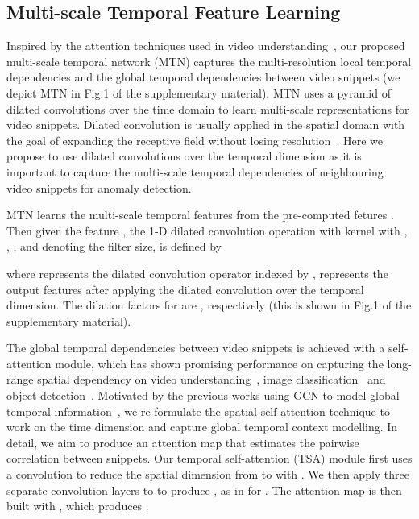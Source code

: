 \documentclass[final]{cvpr}
\begin{document}
\subsection{Multi-scale Temporal Feature Learning}

Inspired by the attention techniques used in video understanding~\cite{wang2018non,8451429}, our proposed multi-scale temporal network (MTN) captures the multi-resolution local temporal dependencies and the global temporal dependencies between video snippets (we depict MTN in Fig.1 of the supplementary material). MTN uses a pyramid of dilated convolutions over the time domain to learn multi-scale representations for video snippets. 
Dilated convolution is usually applied in the spatial domain with the goal of expanding the receptive field without losing resolution~\cite{yu2015multi}. Here we propose to use dilated convolutions over the temporal dimension as it is important to capture the multi-scale temporal dependencies of neighbouring video snippets for anomaly detection.




MTN learns the multi-scale temporal features from the pre-computed fetures
.
Then given the feature , the 1-D dilated convolution operation with kernel  with , , , and  denoting the filter size, is defined by

where  represents the dilated convolution operator indexed by ,
  represents the output features after applying the dilated convolution over the temporal dimension. 
The dilation factors for  are , respectively (this is shown in Fig.1 of the supplementary material).


The global temporal dependencies between video snippets is achieved with a self-attention module, which has shown promising performance on capturing the long-range spatial dependency on video understanding~\cite{wang2018non}, image classification~\cite{zhao2020exploring} and object detection~\cite{perreault2020spotnet}. 
Motivated by the previous works using GCN to model global temporal information~\cite{zhong2019graph,Wu2020not}, we re-formulate the spatial self-attention technique to work on the time dimension and capture global temporal context modelling. In detail, we aim to produce an attention map  that estimates the pairwise correlation between snippets. 
Our temporal self-attention (TSA) module first uses a  convolution to reduce the spatial dimension from  to  with . 
We then apply three separate  convolution layers to  to produce 
, as in
 for .
The attention map is then built with , which 
produces .
\end{document}
